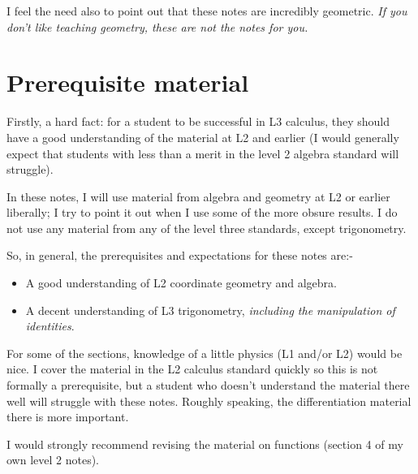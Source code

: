 \documentclass[a4paper]{memoir}
\theoremstyle{definition}
\begin{document}
I feel the need also to point out that these notes are incredibly geometric. \emph{If you don't like teaching geometry, these are not the notes for you.}

\section{Prerequisite material}
Firstly, a hard fact: for a student to be successful in L3 calculus, they should have
a good understanding of the material at L2 and earlier (I would generally expect that
students with less than a merit in the level 2 algebra standard will struggle).

In these notes, I will use material from algebra and geometry at L2 or earlier liberally;
I try to point it out when I use some of the more obsure results. I do not use any
material from any of the level three standards, except trigonometry.

So, in general, the prerequisites and expectations for these notes are:-
\begin{itemize}
  \item A good understanding of L2 coordinate geometry and algebra.
  \item A decent understanding of L3 trigonometry, \emph{including the manipulation of identities}.
\end{itemize}

For some of the sections, knowledge of a little physics (L1 and/or L2) would be nice. I cover
the material in the L2 calculus standard quickly so this is not formally a prerequisite, but a student
who doesn't understand the material there well will struggle with these notes. Roughly speaking,
the differentiation material there is more important.

I would strongly recommend revising the material on functions (section 4 of my own level 2 notes).
\end{document}
